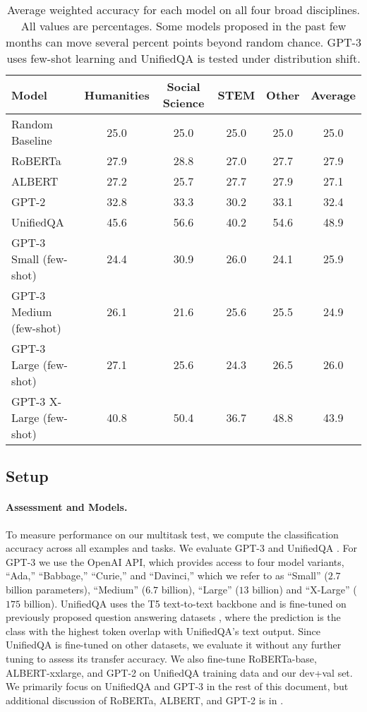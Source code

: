 \begin{table}[b]
\setlength{\tabcolsep}{9pt}
\vspace{-5pt}
\fontsize{10}{11}\selectfont
\centering
\begin{tabular}{lcccc|c}
Model       & Humanities & Social Science & STEM & Other &  Average \\
\hline
Random Baseline & 25.0 & 25.0 & 25.0 & 25.0 & 25.0 \\
RoBERTa           & 27.9 & 28.8 & 27.0 & 27.7 & 27.9 \\
ALBERT           & 27.2 & 25.7 & 27.7 & 27.9 & 27.1 \\
GPT-2           & 32.8 & 33.3 & 30.2 & 33.1 & 32.4 \\
UnifiedQA       & 45.6 & 56.6 & 40.2 & 54.6 & 48.9 \\
GPT-3 Small (few-shot)     & 24.4 & 30.9 & 26.0 & 24.1 & 25.9 \\
GPT-3 Medium (few-shot)   & 26.1 & 21.6 & 25.6 & 25.5 & 24.9 \\
GPT-3 Large (few-shot)     & 27.1 & 25.6 & 24.3 & 26.5 & 26.0 \\
GPT-3 X-Large (few-shot)   & 40.8 & 50.4 & 36.7 & 48.8 & 43.9 \\
\hline
\end{tabular}
\caption{Average weighted accuracy for each model on all four broad disciplines. All values are percentages. Some models proposed in the past few months can move several percent points beyond random chance. GPT-3 uses few-shot learning and UnifiedQA is tested under distribution shift.}
\label{tab:mainresults}
\end{table}

\subsection{Setup}

\paragraph{Assessment and Models.} To measure performance on our multitask test, we compute the classification accuracy across all examples and tasks. We evaluate GPT-3 \citep{brown2020gpt3} and UnifiedQA \citep{khashabi2020unifiedqa}.
For GPT-3 we use the OpenAI API, which provides access to four model variants,  ``Ada,'' ``Babbage,'' ``Curie,'' and ``Davinci,'' which we refer to as ``Small'' ($2.7$ billion parameters), ``Medium'' ($6.7$ billion), ``Large'' ($13$ billion) and ``X-Large'' ($175$ billion). 
UnifiedQA uses the T5 \citep{raffel2019exploringT5} text-to-text backbone and is fine-tuned on previously proposed question answering datasets \citep{lai2017race}, where the prediction is the class with the highest token overlap with UnifiedQA's text output. Since UnifiedQA is fine-tuned on other datasets, we evaluate it without any further tuning to assess its transfer accuracy. We also fine-tune RoBERTa-base, ALBERT-xxlarge, and GPT-2 on UnifiedQA training data and our dev+val set. We primarily focus on UnifiedQA and GPT-3 in the rest of this document, but additional discussion of RoBERTa, ALBERT, and GPT-2 is in .

